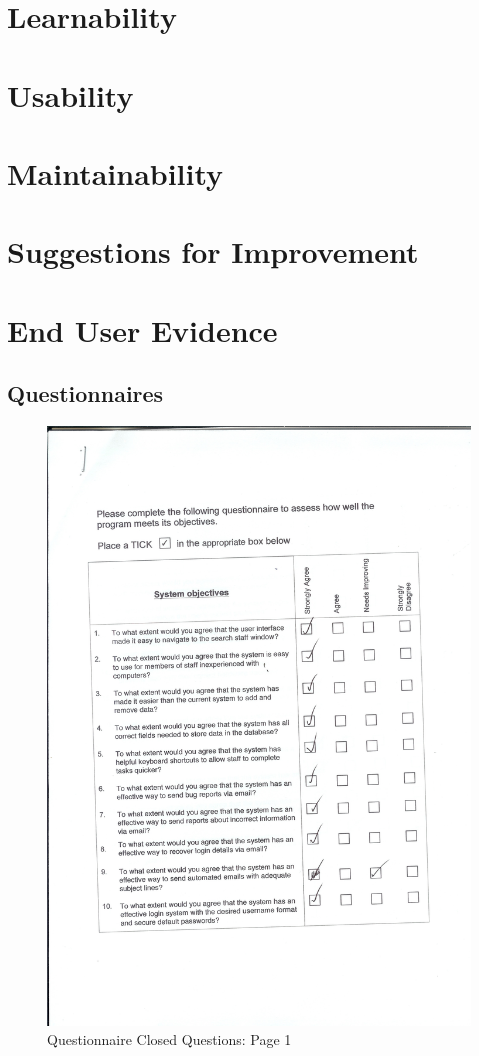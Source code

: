 \section{Learnability}

\section{Usability}

\section{Maintainability}

\section{Suggestions for Improvement}

\section{End User Evidence}
\newpage

\subsection{Questionnaires}\label{qs}

\begin{figure}[H]
    \includegraphics[width=\textwidth]{./Evaluation/EvaluationQuestionnaire/Scan9.jpeg}
    \caption{Questionnaire Closed Questions: Page 1} 
\end{figure}

